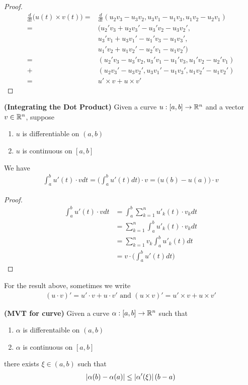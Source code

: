 \documentclass{report}
\begin{document}
\begin{proof}
\begin{align*}
  \frac{d}{dt}\big(u(t)\times v(t) \big)=&\frac{d}{dt}(u_2v_3-u_3v_2,u_3v_1-u_1v_3,u_1v_2-u_2v_1)\\
=&(u_2'v_3+u_2v_3'-u_3'v_2-u_3v_2',\\
 & u_3'v_1+u_3v_1'-u_1'v_3-u_1v_3',\\
 &u_1'v_2+u_1v_2'-u_2'v_1-u_1v_2')\\
=&(u_2'v_3-u_3'v_2,u_3'v_1-u_1'v_3,u_1'v_2-u_2'v_1)\\
+&(u_2v_3'-u_3v_2',u_3v_1'-u_1v_3',u_1v_2'-u_1v_2')\\
=&u'\times v+u \times v'
\end{align*}
\end{proof}
\begin{theorem}
\textbf{(Integrating the Dot Product)} Given a curve $u:[a,b]\rightarrow \mathbb{R}^n$ and a vector $v \in\mathbb{R}^n$, suppose 
\begin{enumerate}[label=(\alph*)]
  \item $u$ is differentiable on $(a,b)$ 
  \item $u$ is continuous on  $[a,b]$
\end{enumerate}
We have 
\begin{align*}
\int_a^b u'(t)\cdot v dt=
\Big(\int_a^b u'(t)dt \Big)\cdot v= \big(u(b)-u(a) \big)\cdot v
\end{align*}
\end{theorem}
\begin{proof}
\begin{align*}
\int_a^b u'(t)\cdot vdt&=\int_a^b \sum_{k=1}^n u'_k(t)\cdot v_k dt \\
&=\sum_{k=1}^n  \int_a^b u'_k(t)\cdot v_k dt\\
&=\sum_{k=1}^n v_k \int_a^b u'_k(t)dt\\
&=v\cdot \Big(\int_a^b u'(t)dt \Big)
\end{align*}
\end{proof}
\begin{mdframed}
For the result above, sometimes we write 
\begin{align*}
  (u\cdot v)'=u'\cdot v+ u \cdot v'\text{ and }(u\times v)'=u' \times v+u\times v'
\end{align*}
\end{mdframed}
\begin{theorem}
\textbf{(MVT for curve)} Given a curve $\alpha  : [a,b]\rightarrow \mathbb{R}^n$ such that 
\begin{enumerate}[label=(\alph*)]
  \item $\alpha  $ is differentaible on $(a,b)$ 
  \item $\alpha  $ is continuous on $[a,b]$
\end{enumerate}
there exists $ \xi  \in (a,b)$ such that 
\begin{align*}
\left|\alpha  (b)-\alpha  (a)\right|\leq \left|\alpha  '(\xi  )\right|(b-a)
\end{align*}
\end{theorem}
\end{document}
